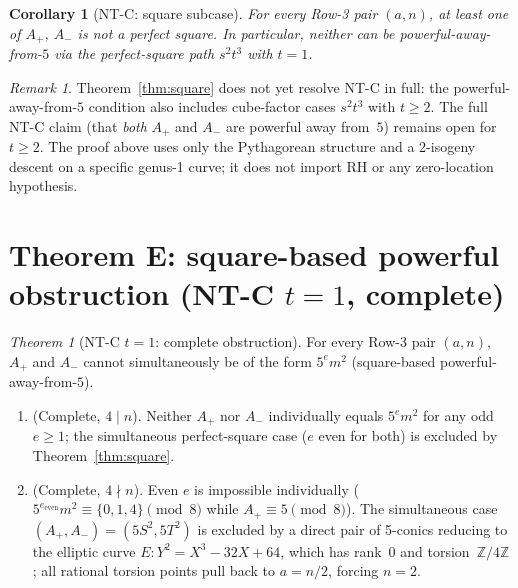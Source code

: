 \documentclass[12pt]{amsart}
\theoremstyle{plain}
\newtheorem{corollary}[theorem]{Corollary}
\theoremstyle{definition}
\theoremstyle{remark}
\newtheorem{remark}[theorem]{Remark}
\newtheorem{mainthm}{Theorem}
\newcommand{\Aplus}{A_{+}}
\newcommand{\Aminus}{A_{-}}
\begin{document}
\begin{corollary}[NT-C: square subcase]
\label{cor:NTC-square}
For every Row-3 pair $(a,n)$, at least one of $\Aplus$, $\Aminus$ is not a
perfect square.  In particular, neither can be powerful-away-from-$5$ via the
perfect-square path $s^2t^3$ with $t=1$.
\end{corollary}

\begin{remark}
Theorem~\ref{thm:square} does not yet resolve NT-C in full: the powerful-away-from-$5$
condition also includes cube-factor cases $s^2t^3$ with $t\geq 2$.
The full NT-C claim (that \emph{both} $\Aplus$ and $\Aminus$ are powerful
away from~$5$) remains open for $t\geq2$.  The proof above uses only the
Pythagorean structure and a 2-isogeny descent on a specific genus-1 curve;
it does not import RH or any zero-location hypothesis.
\end{remark}

\section{Theorem E: square-based powerful obstruction (NT-C $t=1$, complete)}
\label{sec:thmE}%

\begin{mainthm}[NT-C $t=1$: complete obstruction]
\label{thm:squarepow}
For every Row-3 pair $(a,n)$, $\Aplus$ and $\Aminus$ cannot simultaneously be of
the form $5^e m^2$ (square-based powerful-away-from-$5$).
\begin{enumerate}[label=\textup{(\roman*)}]
\item \textup{(Complete, $4\mid n$).}  Neither $\Aplus$ nor $\Aminus$ individually
  equals $5^e m^2$ for any odd $e\geq 1$; the simultaneous perfect-square case
  ($e$ even for both) is excluded by Theorem~\ref{thm:square}.
\item \textup{(Complete, $4\nmid n$).}  Even $e$ is impossible individually
  ($5^{e_{\mathrm{even}}}m^2\equiv\{0,1,4\}\pmod8$ while $\Aplus\equiv5\pmod8$).
  The simultaneous case $(\Aplus,\Aminus)=(5S^2,5T^2)$ is excluded by a direct
  pair of 5-conics reducing to the elliptic curve
  $E\colon Y^2=X^3-32X+64$, which has rank~$0$ and torsion~$\mathbb{Z}/4\mathbb{Z}$;
  all rational torsion points pull back to $a=n/2$, forcing $n=2$.
\end{enumerate}
\end{mainthm}
\end{document}
